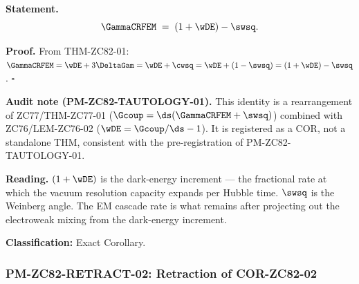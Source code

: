 \documentclass[12pt, a4paper]{article}
\begin{document}
\begin{formalbox}[title={COR-ZC82-01: EM Cascade Decomposition
  ($R_0$, Exact)}]

\textbf{Statement.}
\begin{equation}
  \GammaCRFEM \;=\; (1 + \wDE) - \swsq.
  \label{eq:cascade-decomp}
\end{equation}

\textbf{Proof.}
From THM-ZC82-01: $\GammaCRFEM = \wDE + 3\DeltaGam
= \wDE + \cwsq = \wDE + (1 - \swsq)
= (1 + \wDE) - \swsq$.
\hfill$\square$

\textbf{Audit note (PM-ZC82-TAUTOLOGY-01).}
This identity is a rearrangement of ZC77/THM-ZC77-01
($\Gcoup = \ds(\GammaCRFEM + \swsq)$) combined with
ZC76/LEM-ZC76-02 ($\wDE = \Gcoup/\ds - 1$). It is registered
as a COR, not a standalone THM, consistent with the
pre-registration of PM-ZC82-TAUTOLOGY-01.

\textbf{Reading.}
$(1 + \wDE)$ is the dark-energy increment --- the fractional
rate at which the vacuum resolution capacity expands per
Hubble time. $\swsq$ is the Weinberg angle. The EM cascade rate
is what remains after projecting out the electroweak mixing from
the dark-energy increment.

\textbf{Classification:} Exact Corollary.
\end{formalbox}

\subsubsection{PM-ZC82-RETRACT-02: Retraction of COR-ZC82-02}
\label{sec:cor02}
\end{document}
